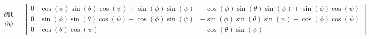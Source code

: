 \documentclass[a4paper,10pt]{article}
\begin{document}
\begin{equation}
	\frac{\partial\bm{R}}{\partial \psi} = \begin{bmatrix}
		0 & \cos \left(\phi\right) \sin \left(\theta\right) \cos \left(\psi\right) +\sin \left(\phi\right) \sin \left(\psi\right) & -\cos \left(\phi\right) \sin \left(\theta\right) \sin \left(\psi\right) + \sin \left(\phi\right) \cos \left(\psi\right) \\
		0 & \sin \left(\phi\right) \sin \left(\theta\right) \cos \left(\psi\right) - \cos \left(\phi\right) \sin \left(\psi\right) & -\sin \left(\phi\right) \sin \left(\theta\right) \sin \left(\psi\right) - \cos \left(\phi\right) \cos \left(\psi\right) \\ 
		0 & \cos \left(\theta\right) \cos \left(\psi\right) & -\cos \left(\theta\right)  \sin \left(\psi\right)
	\end{bmatrix}
\end{equation}
\end{document}
